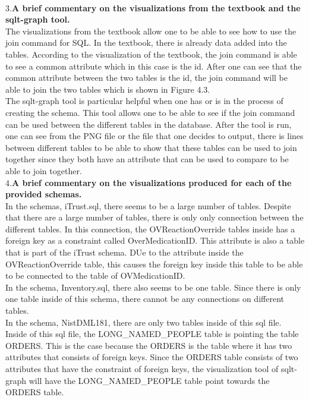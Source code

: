 \documentclass{article}
\begin{document}
\\
3.\textbf{A brief commentary on the visualizations from the textbook and the sqlt-graph tool.}
\\
The visualizations from the textbook allow one to be able to see how to use the join command for SQL. In the textbook, there is already data added into the tables. According to the visualization of the textbook, the join command is able to see a common attribute which in this case is the id. After one can see that the common attribute between the two tables is the id, the join command will be able to join the two tables which is shown in Figure 4.3.
\\
The sqlt-graph tool is particular helpful when one has or is in the process of creating the schema. This tool allows one to be able to see if the join command can be used between the different tables in the database. After the tool is run, one can see from the PNG file or the file that one decides to output, there is lines between different tables to be able to show that these tables can be used to join together since they both have an attribute that can be used to compare to be able to join together. 
\\
4.\textbf{A brief commentary on the visualizations produced for each of the provided schemas.}
\\
In the schemas, iTrust.sql, there seems to be a large number of tables. Despite that there are a large number of tables, there is only only connection between the different tables. In this connection, the OVReactionOverride tables inside has a foreign key as a constraint called OverMedicationID. This attribute is also a table that is part of the iTrust schema. DUe to the attribute inside the OVReactionOverride table, this causes the foreign key inside this table to be able to be connected to the table of OVMedicationID.
\\
In the schema, Inventory.sql, there also seems to be one table. Since there is only one table inside of this schema, there cannot be any connections on different tables.
\\
In the schema, NistDML181, there are only two tables inside of this sql file. Inside of this sql file, the LONG\_NAMED\_PEOPLE table is pointing the table ORDERS. This is the case because the ORDERS is the table where it has two attributes that consists of foreign keys. Since the ORDERS table consists of two attributes that have the constraint of foreign keys, the visualization tool of sqlt-graph will have the LONG\_NAMED\_PEOPLE table point towards the ORDERS table.
\end{document}
